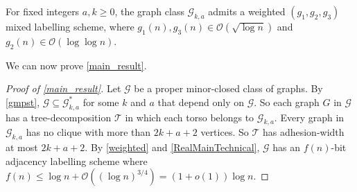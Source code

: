 \documentclass{patmorin}
\renewcommand{\ge}{\geqslant}
\renewcommand{\le}{\leqslant}
\newcommand{\Oh}{\mathcal{O}}
\begin{document}
  \begin{thm}\label{gak_labelling}\label{weighted}
    For fixed integers $a,k\ge 0$, the graph class $\mathcal{G}_{k,a}$ admits a weighted $(g_1,g_2,g_3)$ mixed labelling scheme, where $g_1(n),g_3(n)\in \Oh(\sqrt{\log n})$ and $g_2(n)\in \Oh(\log\log n)$.
  \end{thm}

  We can now prove \cref{main_result}.

  \begin{proof}[Proof of \cref{main_result}]
     Let $\mathcal{G}$ be a proper minor-closed class of graphs.  By \cref{gmpst}, $\mathcal{G}\subseteq \mathcal{G}^*_{k,a}$ for some $k$ and $a$ that depend only on $\mathcal{G}$.  So each graph $G$ in $\mathcal{G}$ has a tree-decomposition $\mathcal{T}$ in which each torso belongs to $\mathcal{G}_{k,a}$. Every graph in $\mathcal{G}_{k,a}$ has no clique with more than $2k+a+2$ vertices. So $\mathcal{T}$ has adhesion-width at most $2k+a+2$.    By \cref{weighted} and \cref{RealMainTechnical}, $\mathcal{G}$ has an $f(n)$-bit adjacency labelling scheme where
     $f(n) \le \log n + \Oh((\log n)^{3/4}) = (1+o(1))\log n$.
  \end{proof}
\end{document}
